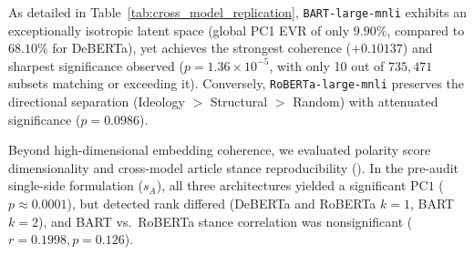 As detailed in Table~\ref{tab:cross_model_replication}, \texttt{BART-large-mnli} exhibits an exceptionally isotropic latent space (global PC1 EVR of only $9.90\%$, compared to $68.10\%$ for DeBERTa), yet achieves the strongest coherence ($+0.10137$) and sharpest significance observed ($p = 1.36 \times 10^{-5}$, with only 10 out of $735{,}471$ subsets matching or exceeding it). Conversely, \texttt{RoBERTa-large-mnli} preserves the directional separation (Ideology $>$ Structural $>$ Random) with attenuated significance ($p = 0.0986$). 

Beyond high-dimensional embedding coherence, we evaluated polarity score dimensionality and cross-model article stance reproducibility (). In the pre-audit single-side formulation ($s_A$), all three architectures yielded a significant $\mathrm{PC1}$ ($p \approx 0.0001$), but detected rank differed (DeBERTa and RoBERTa $k=1$, BART $k=2$), and BART vs.\ RoBERTa stance correlation was nonsignificant ($r = 0.1998, p = 0.126$).


